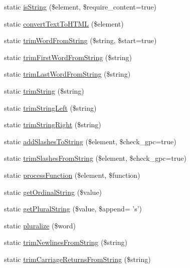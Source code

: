 \begin{DoxyCompactItemize}
\item 
static \hyperlink{class_strings_a5b990c86396c708411bd61def2d8d71f}{is\-String} (\$element, \$require\-\_\-content=true)
\item 
static \hyperlink{class_strings_aaed8951dec6916ab4398072fb68dcfd5}{convert\-Text\-To\-H\-T\-M\-L} (\$element)
\item 
static \hyperlink{class_strings_aec4ed48b24e61184635f60d4402a75ef}{trim\-Word\-From\-String} (\$string, \$start=true)
\item 
static \hyperlink{class_strings_a6b9cecd90d792dbadcc59c07170f162d}{trim\-First\-Word\-From\-String} (\$string)
\item 
static \hyperlink{class_strings_a68f3f2ea745b7e69336cce7f286b0f0a}{trim\-Last\-Word\-From\-String} (\$string)
\item 
static \hyperlink{class_strings_a38559ba24510c8212a3ddf7a2f280688}{trim\-String} (\$string)
\item 
static \hyperlink{class_strings_a5fc0a502d51d9cc6a7f054b8ec01583a}{trim\-String\-Left} (\$string)
\item 
static \hyperlink{class_strings_ac2b911855f7f93180b39c4cbbe730c28}{trim\-String\-Right} (\$string)
\item 
static \hyperlink{class_strings_a3bd1e606cfb8ad12731bc78482ba0d62}{add\-Slashes\-To\-String} (\$element, \$check\-\_\-gpc=true)
\item 
static \hyperlink{class_strings_ad00f243bfb21f0bb18b6f4274d588aa5}{trim\-Slashes\-From\-String} (\$element, \$check\-\_\-gpc=true)
\item 
static \hyperlink{class_strings_ae1c1171efc438e64ced82a8cab03a997}{process\-Function} (\$element, \$function)
\item 
static \hyperlink{class_strings_ae09459f0a67d58086ea2147c46063d1f}{get\-Ordinal\-String} (\$value)
\item 
static \hyperlink{class_strings_a8dabfdfce899c4d35f3d1c62c73edb77}{get\-Plural\-String} (\$value, \$append= 's')
\item 
static \hyperlink{class_strings_ac71d8bc1b41c481249f5b5d3525e2c25}{pluralize} (\$word)
\item 
static \hyperlink{class_strings_a882fb2e34ce74b853346ff65e2fe1037}{trim\-Newlines\-From\-String} (\$string)
\item 
static \hyperlink{class_strings_a00d3f736c77c29252073d1b7a7ee6f0e}{trim\-Carriage\-Returns\-From\-String} (\$string)
\item 

\end{DoxyCompactItemize}
